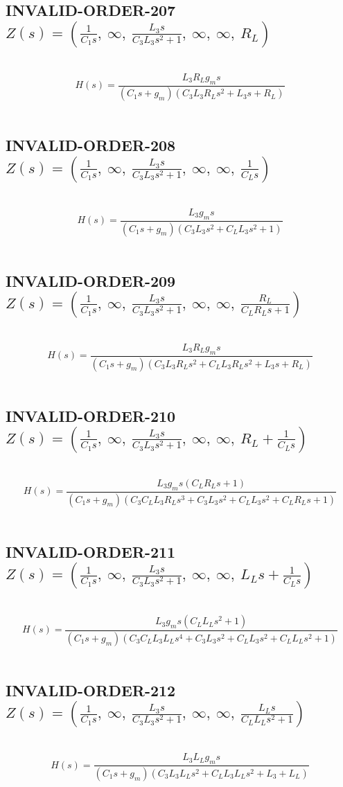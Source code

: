 \documentclass{article}
\begin{document}
\subsection{INVALID-ORDER-207 $Z(s) = \left( \frac{1}{C_{1} s}, \  \infty, \  \frac{L_{3} s}{C_{3} L_{3} s^{2} + 1}, \  \infty, \  \infty, \  R_{L}\right)$ } \ 
\textbf{\[H(s) = \frac{L_{3} R_{L} g_{m} s}{\left(C_{1} s + g_{m}\right) \left(C_{3} L_{3} R_{L} s^{2} + L_{3} s + R_{L}\right)}\] } \ 
\subsection{INVALID-ORDER-208 $Z(s) = \left( \frac{1}{C_{1} s}, \  \infty, \  \frac{L_{3} s}{C_{3} L_{3} s^{2} + 1}, \  \infty, \  \infty, \  \frac{1}{C_{L} s}\right)$ } \ 
\textbf{\[H(s) = \frac{L_{3} g_{m} s}{\left(C_{1} s + g_{m}\right) \left(C_{3} L_{3} s^{2} + C_{L} L_{3} s^{2} + 1\right)}\] } \ 
\subsection{INVALID-ORDER-209 $Z(s) = \left( \frac{1}{C_{1} s}, \  \infty, \  \frac{L_{3} s}{C_{3} L_{3} s^{2} + 1}, \  \infty, \  \infty, \  \frac{R_{L}}{C_{L} R_{L} s + 1}\right)$ } \ 
\textbf{\[H(s) = \frac{L_{3} R_{L} g_{m} s}{\left(C_{1} s + g_{m}\right) \left(C_{3} L_{3} R_{L} s^{2} + C_{L} L_{3} R_{L} s^{2} + L_{3} s + R_{L}\right)}\] } \ 
\subsection{INVALID-ORDER-210 $Z(s) = \left( \frac{1}{C_{1} s}, \  \infty, \  \frac{L_{3} s}{C_{3} L_{3} s^{2} + 1}, \  \infty, \  \infty, \  R_{L} + \frac{1}{C_{L} s}\right)$ } \ 
\textbf{\[H(s) = \frac{L_{3} g_{m} s \left(C_{L} R_{L} s + 1\right)}{\left(C_{1} s + g_{m}\right) \left(C_{3} C_{L} L_{3} R_{L} s^{3} + C_{3} L_{3} s^{2} + C_{L} L_{3} s^{2} + C_{L} R_{L} s + 1\right)}\] } \ 
\subsection{INVALID-ORDER-211 $Z(s) = \left( \frac{1}{C_{1} s}, \  \infty, \  \frac{L_{3} s}{C_{3} L_{3} s^{2} + 1}, \  \infty, \  \infty, \  L_{L} s + \frac{1}{C_{L} s}\right)$ } \ 
\textbf{\[H(s) = \frac{L_{3} g_{m} s \left(C_{L} L_{L} s^{2} + 1\right)}{\left(C_{1} s + g_{m}\right) \left(C_{3} C_{L} L_{3} L_{L} s^{4} + C_{3} L_{3} s^{2} + C_{L} L_{3} s^{2} + C_{L} L_{L} s^{2} + 1\right)}\] } \ 
\subsection{INVALID-ORDER-212 $Z(s) = \left( \frac{1}{C_{1} s}, \  \infty, \  \frac{L_{3} s}{C_{3} L_{3} s^{2} + 1}, \  \infty, \  \infty, \  \frac{L_{L} s}{C_{L} L_{L} s^{2} + 1}\right)$ } \ 
\textbf{\[H(s) = \frac{L_{3} L_{L} g_{m} s}{\left(C_{1} s + g_{m}\right) \left(C_{3} L_{3} L_{L} s^{2} + C_{L} L_{3} L_{L} s^{2} + L_{3} + L_{L}\right)}\] } \ 
\end{document}
